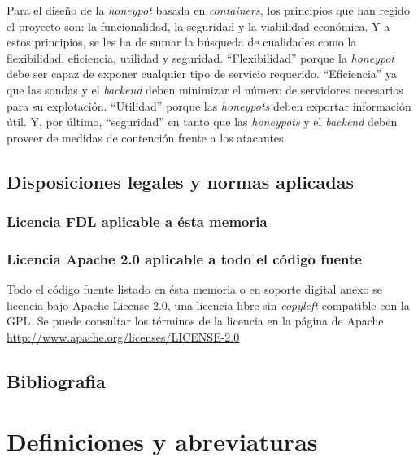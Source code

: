 Para el diseño de la \emph{honeypot} basada en \emph{containers}, los principios que han regido el proyecto son: la funcionalidad, la seguridad y la viabilidad económica. Y a estos principios, se les ha de sumar la búsqueda de cualidades como la flexibilidad, eficiencia, utilidad y seguridad. ``Flexibilidad'' porque la \emph{honeypot} debe ser capaz de exponer cualquier tipo de servicio requerido. ``Eficiencia'' ya que las sondas y el \emph{backend} deben minimizar el número de servidores necesarios para su explotación. ``Utilidad'' porque las \emph{honeypots} deben exportar información útil. Y, por último, ``seguridad''  en tanto que las \emph{honeypots} y el \emph{backend} deben proveer de medidas de contención frente a los atacantes.


\nocite{*}
\nopagebreak
\printbibheading[title={Normas y referencias},heading=subbibnumbered]
\subsection{Disposiciones legales y normas aplicadas}
\subsubsection{Licencia FDL aplicable a ésta memoria}

\subsubsection{Licencia Apache 2.0 aplicable a todo el código fuente}
Todo el código fuente listado en ésta memoria o en soporte digital anexo se licencia bajo Apache License 2.0, una licencia libre sin \emph{copyleft} compatible con la GPL.
Se puede consultar los términos de la licencia en la página de Apache \url{http://www.apache.org/licenses/LICENSE-2.0}

\subsection{Bibliografia}
\printbibliography[title={Referencias},heading=none]
\nopagebreak
\section{Definiciones y abreviaturas}

